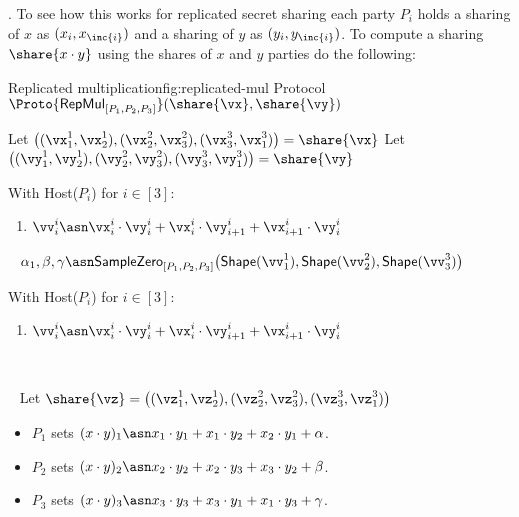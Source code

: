 . 
To see how this works for replicated secret sharing each party $P_i$ holds a
sharing of $x$ as $(x_i, x_{ \inc{i} })$ and a sharing of $y$ as $(y_i, y_{
\inc{i} })$. To compute a sharing $\share{x \cdot y}$ using the shares of $x$
and $y$ parties do the following:



\begin{Boxfig}{Replicated multiplication}{fig:replicated-mul}
  {Protocol $\Proto{\mathsf{RepMul}_{[P_1, P_2, P_3]}}(\share{\vx}, \share{\vy})$}
  
  Let $\big((\vx_1^1, \vx_2^1), (\vx_2^2, \vx_3^2), (\vx_3^3, \vx_1^3) \big) = \share{\vx}$ \newline
  Let $\big((\vy_1^1, \vy_2^1), (\vy_2^2, \vy_3^2), (\vy_3^3, \vy_1^3) \big) = \share{\vy}$ \newline
  
  With Host($P_i$) for $i \in [3]$:
  \begin{enumerate}
    \item $\vv_i^i \asn \vx_i^i \cdot \vy_i^i + \vx_i^i \cdot \vy_{i+1}^i + \vx_{i+1}^i \cdot \vy_i^i$
  \end{enumerate}
  ~\newline
  $\alpha_1, \beta, \gamma \asn \mathsf{SampleZero}_{[P_1, P_2, P_3]}\big( \mathsf{Shape}(\vv_1^1), \mathsf{Shape}\mathsf(\vv_2^2), \mathsf{Shape}\mathsf(\vv_3^3) \big)$
  
  With Host($P_i$) for $i \in [3]$:
  \begin{enumerate}
    \item $\vv_i^i \asn \vx_i^i \cdot \vy_i^i + \vx_i^i \cdot \vy_{i+1}^i + \vx_{i+1}^i \cdot \vy_i^i$
  \end{enumerate}
  ~\newline
  
  ~\newline
  Let $\share{\vz} = \big((\vz_1^1, \vz_2^1), (\vz_2^2, \vz_3^2), (\vz_3^3, \vz_1^3) \big)$
  
  
\end{Boxfig}

\begin{itemize}
    \item $P_1$ sets $(x \cdot y)_{1} \asn x_1 \cdot y_1 + x_1 \cdot y_2 + x_2 \cdot
    y_1 + \alpha$.
    \item $P_2$ sets $(x \cdot y)_2 \asn x_2 \cdot y_2 + x_2 \cdot y_3 + x_3
    \cdot y_2 + \beta$.
    \item $P_3$ sets $(x \cdot y)_3 \asn x_3 \cdot y_3 + x_3 \cdot y_1 + x_1 \cdot y_3 +
    \gamma$.
\end{itemize}


